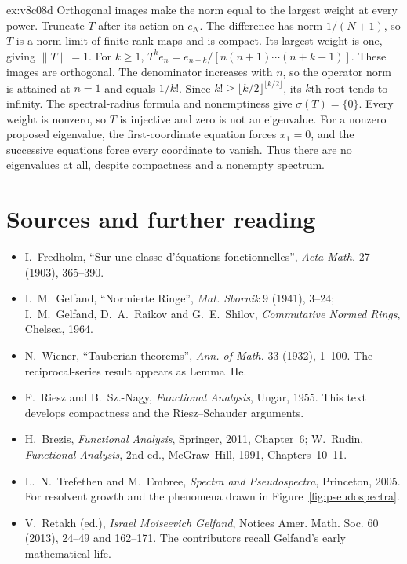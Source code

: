 \begin{solution}{ex:v8c08d}
\idea Orthogonal images make the norm equal to the largest weight at every power.
\writeup Truncate $T$ after its action on $e_N$. The difference has norm $1/(N+1)$, so $T$ is a norm limit of finite-rank maps and is compact. Its largest weight is one, giving $\|T\|=1$.
For $k\ge1$,
$T^ke_n=e_{n+k}/[n(n+1)\cdots(n+k-1)]$.
These images are orthogonal. The denominator increases with $n$, so the operator norm is attained at $n=1$ and equals $1/k!$. Since $k!\ge\lfloor k/2\rfloor^{\lfloor k/2\rfloor}$, its $k$th root tends to infinity. The spectral-radius formula and nonemptiness give $\sigma(T)=\{0\}$.
Every weight is nonzero, so $T$ is injective and zero is not an eigenvalue. For a nonzero proposed eigenvalue, the first-coordinate equation forces $x_1=0$, and the successive equations force every coordinate to vanish. Thus there are no eigenvalues at all, despite compactness and a nonempty spectrum.
\end{solution}

\section*{Sources and further reading}

\begin{itemize}
\item I.~Fredholm, ``Sur une classe d'\'equations fonctionnelles'', \emph{Acta Math.} 27 (1903), 365--390.
\item I.~M.~Gelfand, ``Normierte Ringe'', \emph{Mat. Sbornik} 9 (1941), 3--24; I.~M.~Gelfand, D.~A.~Raikov and G.~E.~Shilov, \emph{Commutative Normed Rings}, Chelsea, 1964.
\item N.~Wiener, ``Tauberian theorems'', \emph{Ann. of Math.} 33 (1932), 1--100. The reciprocal-series result appears as Lemma~IIe.
\item F.~Riesz and B.~Sz.-Nagy, \emph{Functional Analysis}, Ungar, 1955. This text develops compactness and the Riesz--Schauder arguments.
\item H.~Brezis, \emph{Functional Analysis}, Springer, 2011, Chapter~6; W.~Rudin, \emph{Functional Analysis}, 2nd ed., McGraw--Hill, 1991, Chapters~10--11.
\item L.~N.~Trefethen and M.~Embree, \emph{Spectra and Pseudospectra}, Princeton, 2005. For resolvent growth and the phenomena drawn in Figure~\ref{fig:pseudospectra}.
\item V.~Retakh (ed.), \emph{Israel Moiseevich Gelfand}, Notices Amer. Math. Soc. 60 (2013), 24--49 and 162--171. The contributors recall Gelfand's early mathematical life.
\end{itemize}
